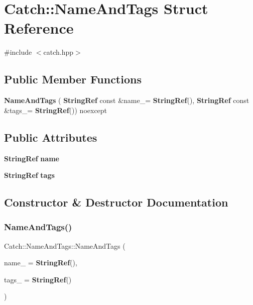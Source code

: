 \section{Catch\+::Name\+And\+Tags Struct Reference}
\label{struct_catch_1_1_name_and_tags}


{\ttfamily \#include $<$catch.\+hpp$>$}

\subsection*{Public Member Functions}
\begin{DoxyCompactItemize}
\item 
\textbf{ Name\+And\+Tags} (\textbf{ String\+Ref} const \&name\+\_\+=\textbf{ String\+Ref}(), \textbf{ String\+Ref} const \&tags\+\_\+=\textbf{ String\+Ref}()) noexcept
\end{DoxyCompactItemize}
\subsection*{Public Attributes}
\begin{DoxyCompactItemize}
\item 
\textbf{ String\+Ref} \textbf{ name}
\item 
\textbf{ String\+Ref} \textbf{ tags}
\end{DoxyCompactItemize}


\subsection{Constructor \& Destructor Documentation}
\mbox{\label{struct_catch_1_1_name_and_tags_ab585111e615ce8c504a2b9630de8ee94}} 
\subsubsection{NameAndTags()}
{\footnotesize\ttfamily Catch\+::\+Name\+And\+Tags\+::\+Name\+And\+Tags (\begin{DoxyParamCaption}\item[{\textbf{ String\+Ref} const \&}]{name\+\_\+ = {\ttfamily \textbf{ String\+Ref}()},  }\item[{\textbf{ String\+Ref} const \&}]{tags\+\_\+ = {\ttfamily \textbf{ String\+Ref}()} }\end{DoxyParamCaption})\hspace{0.3cm}{\ttfamily [noexcept]}}




